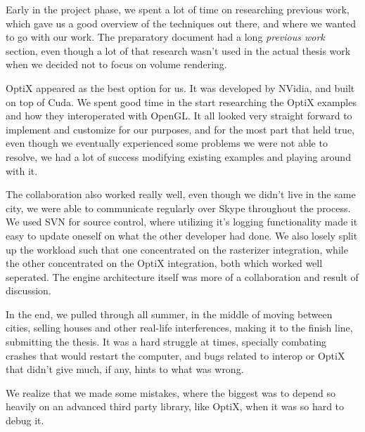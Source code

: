 Early in the project phase, we spent a lot of time on researching previous work, which gave us a good overview of the techniques out there, and where we wanted to go with our work. The preparatory document had a long \emph{previous work} section, even though a lot of that research wasn't used in the actual thesis work when we decided not to focus on volume rendering.

OptiX appeared as the best option for us. It was developed by NVidia, and built on top of Cuda. We spent good time in the start researching the OptiX examples and how they interoperated with OpenGL. It all looked very straight forward to implement and customize for our purposes, and for the most part that held true, even though we eventually experienced some problems we were not able to resolve, we had a lot of success modifying existing examples and playing around with it.

The collaboration also worked really well, even though we didn't live in the same city, we were able to communicate regularly over Skype throughout the process. We used SVN for source control, where utilizing it's logging functionality made it easy to update oneself on what the other developer had done. We also losely split up the workload such that one concentrated on the rasterizer integration, while the other concentrated on the OptiX integration, both which worked well seperated. The engine architecture itself was more of a collaboration and result of discussion.

In the end, we pulled through all summer, in the middle of moving between cities, selling houses and other real-life interferences, making it to the finish line, submitting the thesis. It was a hard struggle at times, specially combating crashes that would restart the computer, and bugs related to interop or OptiX that didn't give much, if any, hints to what was wrong.

We realize that we made some mistakes, where the biggest was to depend so heavily on an advanced third party library, like OptiX, when it was so hard to debug it.
